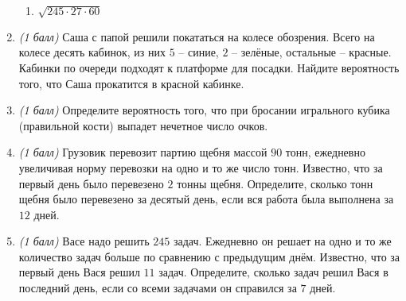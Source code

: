 \documentclass[12pt, a4paper]{article}
\begin{document}
\begin{enumerate}
\begin{multicols}{2}
\begin{enumerate}[label=\asbuk*)]
				\item  $\sqrt{245 \cdot 27 \cdot 60}$
			\end{enumerate}
		\end{multicols}
		\item \textit{(1 балл)} Саша с папой решили покататься на колесе обозрения. Всего на колесе десять кабинок, из них $5$ – синие, $2$ – зелёные, остальные – красные. Кабинки по очереди подходят к платформе для посадки. Найдите вероятность того, что Саша прокатится в красной кабинке.
		\item \textit{(1 балл)} Определите вероятность того, что при бросании игрального кубика (правильной кости) выпадет нечетное число очков.
		\item \textit{(1 балл)} Грузовик перевозит партию щебня массой $90$ тонн, ежедневно увеличивая норму перевозки на одно и то же число тонн. Известно, что за первый день было перевезено $2$ тонны щебня. Определите, сколько тонн щебня было перевезено за десятый день, если вся работа была выполнена за $12$ дней.
		\item \textit{(1 балл)} Васе надо решить $245$ задач. Ежедневно он решает на одно и то же количество задач больше по сравнению с предыдущим днём. Известно, что за первый день Вася решил $11$ задач. Определите, сколько задач решил Вася в последний день, если со всеми задачами он справился за $7$ дней.
	\end{enumerate}
\end{document}
